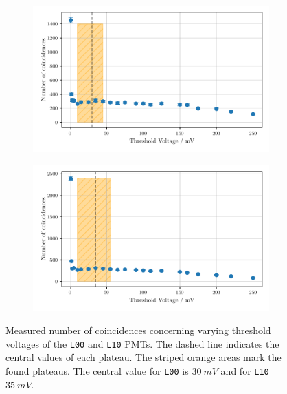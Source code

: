 \begin{figure}
    \centering
    \begin{subfigure}[b]{0.48\textwidth}
        \includegraphics[width=\textwidth]{plots/threshL00.pdf}
    \end{subfigure}\hfill
    \begin{subfigure}[b]{0.48\textwidth}
        \includegraphics[width=\textwidth]{plots/threshL10.pdf}
    \end{subfigure}
    \caption{Measured number of coincidences concerning varying threshold voltages
    of the \texttt{L00} and \texttt{L10} PMTs.
    The dashed line indicates the central values of each plateau. The striped orange areas mark the found plateaus.
    The central value for \texttt{L00} is $\SI{30}{mV}$ and for \texttt{L10} $\SI{35}{mV}$.}
    \label{fig:appthresh3}
\end{figure}
